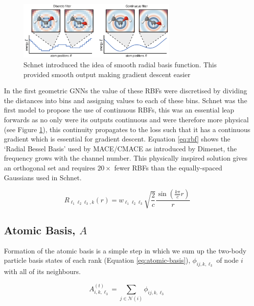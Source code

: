 \begin{figure}
    \centering
    \includegraphics[width=0.7\textwidth]{figures/disc-cont-filter.png}
    \caption{Schnet introduced the idea of smooth radial basis function. This provided smooth output making gradient descent easier}
    \label{fig:disc-cont-filter}
\end{figure}

In the first geometric GNNs \cite{gilmer2017neural} the value of these RBFs were discretised by dividing the distances into bins and assigning values to each of these bins. Schnet was the first model to propose the use of continuous RBFs, this was an essential leap forwards as no only were its outputs continuous and were therefore more physical (see Figure \ref{fig:disc-cont-filter}), this continuity propagates to the loss such that it has a continuous gradient which is essential for gradient descent. Equation \ref{eq:rbf} shows the `Radial Bessel Basis' used by MACE/CMACE as introduced by Dimenet, the frequency grows with the channel number. This physically inspired solution gives an orthogonal set and requires $20\times$ fewer RBFs than the equally-spaced Gaussians used in Schnet.

\begin{equation} \label{eq:rbf}
    R_{\ell_1\ell_2\ell_3,k} (r) = w_{\ell_1\ell_2\ell_3} \sqrt{\frac{2}{c}} \frac{\sin(\frac{k\pi}{c}r)}{r}
\end{equation}

\subsection{Atomic Basis, $A$} 

Formation of the atomic basis is a simple step in which we sum up the two-body particle basis states of each rank (Equation \ref{eq:atomic-basis}), $\phi_{ij,k,\ell_3}$ of node $i$ with all of its neighbours.

\begin{equation} \label{eq:atomic-basis}
    A^{(t)}_{i,k,\ell_3} = \sum_{j \in \mathcal N(i)} \phi_{ij,k,\ell_3}
\end{equation}

